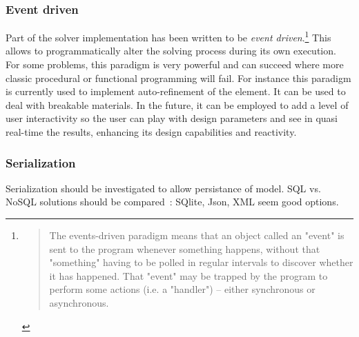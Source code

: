 \subsubsection{Event driven}
Part of the solver implementation has been written to be \emph{event driven}.\footnote{\blockquote{The events-driven paradigm means that an object called an "event" is sent to the program whenever something happens, without that "something" having to be polled in regular intervals to discover whether it has happened. That "event" may be trapped by the program to perform some actions (i.e. a "handler") -- either synchronous or asynchronous.}} This allows to programmatically alter the solving process during its own execution. For some problems, this paradigm is very powerful and can succeed where more classic procedural or functional programming will fail. For instance this paradigm is currently used to implement auto-refinement of the element. It can be used to deal with breakable materials. In the future, it can be employed to add a level of user interactivity so the user can play with design parameters and see in quasi real-time the results, enhancing its design capabilities and reactivity.


\subsubsection{Serialization}
Serialization should be investigated to allow persistance of model. SQL vs. NoSQL solutions should be compared~: SQlite, Json, XML seem good options.

